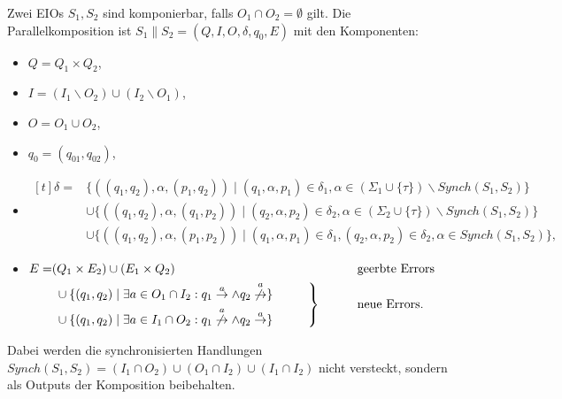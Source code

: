 \begin{Def}[Parallelkomposition]
  Zwei EIOs $S_1, S_2$ sind komponierbar, falls
  $O_1\cap O_2=\emptyset$ gilt. Die Parallelkomposition ist
  $S_1\|S_2=(Q,I,O,\delta ,q_0,E)$ mit den Komponenten:
  \begin{itemize}
    \item $Q=Q_1\times Q_2$,
    \item $I=(I_1\backslash O_2)\cup(I_2\backslash O_1)$,
    \item $O=O_1\cup O_2$,
    \item $q_0=(q_{01},q_{02})$,
    \item $\begin{aligned}[t]
    \delta =&\{((q_1,q_2),\alpha ,(p_1,q_2))\mid (q_1,\alpha ,p_1)\in\delta
      _1,\alpha\in(\Sigma _1\cup\{\tau\})\backslash Synch(S_1,S_2)\}\\
      &\cup\{((q_1,q_2),\alpha ,(q_1,p_2))\mid (q_2,\alpha ,p_2)\in\delta
      _2,\alpha\in(\Sigma _2\cup\{\tau\})\backslash Synch(S_1,S_2)\}\\
      &\cup\{((q_1,q_2),\alpha ,(p_1,p_2))\mid (q_1,\alpha ,p_1)\in\delta
      _1, (q_2,\alpha ,p_2)\in\delta _2, \alpha\in Synch(S_1,S_2)\},
  \end{aligned}$
    \item $\begin{aligned}[t]
        E=&(Q_1\times E_2)\cup (E_1\times Q_2)
        &&\phantom{neue}\mathrm{geerbte}~\mathrm{Errors}\\
        &\left.\begin{aligned}
        &\cup\{(q_1,q_2)\mid \exists a\in O_1\cap I_2: q_1\overset{a}{\rightarrow}\wedge
      q_2\overset{a}{\not{\hspace{-0.1cm}\rightarrow}}\}\\
      &\cup\{(q_1,q_2)\mid \exists a\in I_1\cap O_2:
q_1\overset{a}{\not{\hspace{-0.1cm}\rightarrow}}\wedge
q_2\overset{a}{\rightarrow}\}
\end{aligned}\hspace{1cm}\right\}
      &&\phantom{neue}\mathrm{neue}~\mathrm{Errors}.\\
  \end{aligned}$
  \end{itemize}
  Dabei werden die synchronisierten Handlungen $Synch(S_1,
  S_2)=(I_1\cap O_2)\cup(O_1\cap I_2)\cup (I_1\cap I_2)$ nicht versteckt, sondern als Outputs der
  Komposition beibehalten.
\end{Def}

